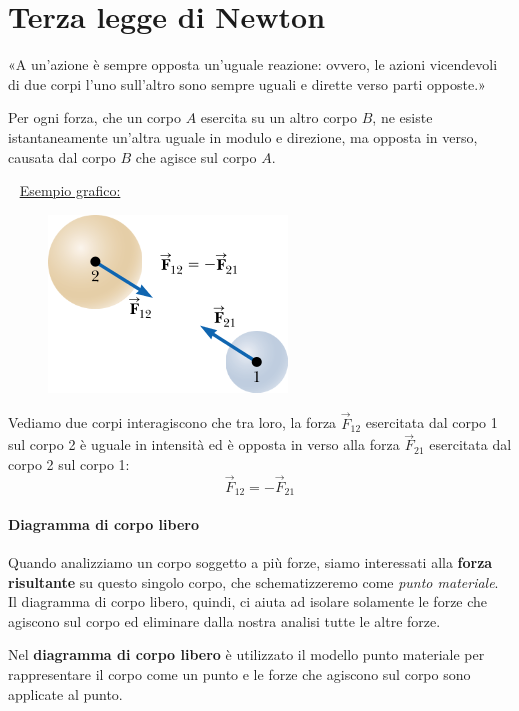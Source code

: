 \documentclass[12pt,oneside]{book}
\begin{document}
\section{Terza legge di Newton}
«A un'azione è sempre opposta un'uguale reazione: ovvero, le azioni vicendevoli di due corpi l'uno sull'altro sono sempre uguali e dirette verso parti opposte.»

\begin{displayquote}
    \centering
    Per ogni forza, che un corpo $A$ esercita su un altro corpo $B$, ne esiste istantaneamente un'altra
    uguale in modulo e direzione, ma opposta in verso, causata dal corpo $B$ che agisce sul corpo $A$.
\end{displayquote}

~\newline
\underline{Esempio grafico:}

\begin{figure}[h]
    \centering
    \includegraphics[scale=0.4]{terza_legge_newton}
\end{figure}
\noindent Vediamo due corpi interagiscono che tra loro, la forza $\vec{F}_{12}$ esercitata dal corpo 1 sul corpo 2 è uguale in intensità ed è opposta
in verso alla forza $\vec{F}_{21}$ esercitata dal corpo 2 sul corpo 1:
\begin{equation*}
    \vec{F}_{12} = -\vec{F}_{21}
\end{equation*}

\paragraph{Diagramma di corpo libero}  Quando analizziamo un corpo soggetto a più forze, siamo interessati alla \textbf{forza risultante} 
su questo singolo corpo, che schematizzeremo come \emph{punto materiale}. Il diagramma di corpo libero, quindi, ci aiuta ad isolare solamente le forze che 
agiscono sul corpo ed eliminare dalla nostra analisi tutte le altre forze.

Nel \textbf{diagramma di corpo libero} è utilizzato il modello punto materiale per rappresentare il corpo come un punto e le forze che agiscono sul corpo sono applicate al punto.
\end{document}
